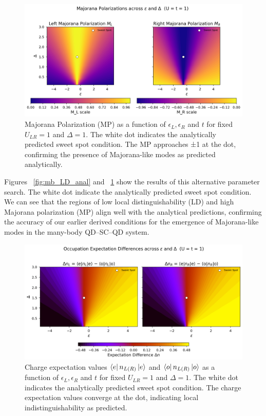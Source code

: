 \documentclass[11pt, letterpaper, titlepage]{article}
\begin{document}
\begin{figure}[htbp]
  \centering
  \includegraphics[width=1\textwidth]{../Figures/MP_anal.png}
  \caption{Majorana Polarization (MP) as a function of $ϵ_L,ϵ_R$ and $t$ for fixed $U_{LR} = 1$ and $Δ = 1$. The white dot indicates the analytically predicted sweet spot condition. The MP approaches ±1 at the dot, confirming the presence of Majorana-like modes as predicted analytically.}
  \label{fig:mb_MP_anal}
\end{figure}
Figures ~\ref{fig:mb_LD_anal} and ~\ref{fig:mb_MP_anal} show the results of this alternative parameter search. The white dot indicate the analytically predicted sweet spot condition. We can see that the regions of low local distinguishability (LD) and high Majorana polarization (MP) align well with the analytical predictions, confirming the accuracy of our earlier derived conditions for the emergence of Majorana-like modes in the many-body QD–SC–QD system.
\newpage  
\begin{figure}
  \centering
  \includegraphics[width=1\textwidth]{../Figures/Exp_anal.png}
  \caption{Charge expectation values $\bra{e}n_{L(R)}\ket{e}$ and $\bra{o}n_{L(R)}\ket{o}$ as a function of $ϵ_L,ϵ_R$ and $t$ for fixed $U_{LR} = 1$ and $Δ = 1$. The white dot indicates the analytically predicted sweet spot condition. The charge expectation values converge at the dot, indicating local indistinguishability as predicted.}
  \label{fig:mb_charge_anal}
\end{figure}
\end{document}
